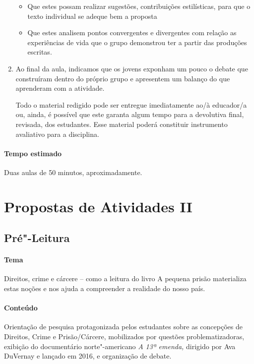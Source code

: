 \documentclass[11pt]{extarticle}
\begin{document}
\begin{enumerate}
\begin{itemize}
\item Que estes possam
realizar sugestões, contribuições estilísticas, para que o texto
individual se adeque bem a proposta
\item Que estes analisem pontos
convergentes e divergentes com relação as experiências de vida que o
grupo demonstrou ter a partir das produções escritas. 
\end{itemize}

\item Ao final da aula,
indicamos que os jovens exponham um pouco o debate que construíram
dentro do próprio grupo e apresentem um balanço do que aprenderam com a
atividade.

Todo o material redigido pode ser entregue imediatamente ao/à educador/a
ou, ainda, é possível que este garanta algum tempo para a devolutiva
final, revisada, dos estudantes. Esse material poderá constituir
instrumento avaliativo para a disciplina.
\end{enumerate}

\paragraph{Tempo estimado} Duas aulas de 50 minutos, aproximadamente.


\section{Propostas de Atividades II}


\subsection{Pré"-Leitura}

\paragraph{Tema} Direitos, crime e cárcere -- como a leitura do livro A
pequena prisão materializa estas noções e nos ajuda a compreender a
realidade do nosso país.

\paragraph{Conteúdo} Orientação de pesquisa protagonizada pelos estudantes
sobre as concepções de Direitos, Crime e Prisão/Cárcere, mobilizados por
questões problematizadoras, exibição do documentário norte"-americano
\emph{A 13ª emenda,} dirigido por Ava DuVernay e lançado em 2016, e
organização de debate.
\end{document}
